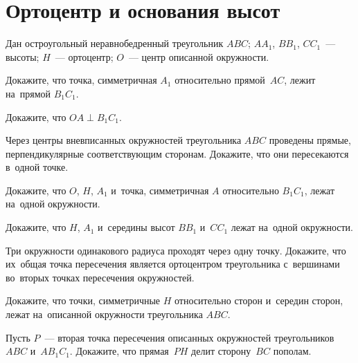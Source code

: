
\section*{Ортоцентр и основания высот}


Дан остроугольный неравнобедренный треугольник $ABC$;
$A A_1$, $B B_1$, $C C_1$~--- высоты;
$H$~--- ортоцентр;
$O$~--- центр описанной окружности.

\begin{problems}

\item
Докажите, что точка, симметричная $A_1$ относительно прямой~$AC$, лежит
на~прямой $B_1 C_1$.

\item
Докажите, что $OA \perp B_1 C_1$.

\item
Через центры вневписанных окружностей треугольника $ABC$ проведены прямые,
перпендикулярные соответствующим сторонам.
Докажите, что они пересекаются в~одной точке.

\item
Докажите, что $O$, $H$, $A_1$ и~точка, симметричная $A$ относительно $B_1 C_1$,
лежат на~одной окружности.

\item
Докажите, что $H$, $A_1$ и~середины высот $B B_1$ и~$C C_1$ лежат на~одной
окружности.

\item
Три окружности одинакового радиуса проходят через одну точку.
Докажите, что их~общая точка пересечения является ортоцентром треугольника
с~вершинами во~вторых точках пересечения окружностей.


\item
Докажите, что точки, симметричные $H$ относительно сторон и~середин сторон,
лежат на~описанной окружности треугольника $ABC$.

\item
Пусть $P$~--- вторая точка пересечения описанных окружностей треугольников
$ABC$ и~$A B_1 C_1$.
Докажите, что прямая~$PH$ делит сторону~$BC$ пополам.


\end{problems}
